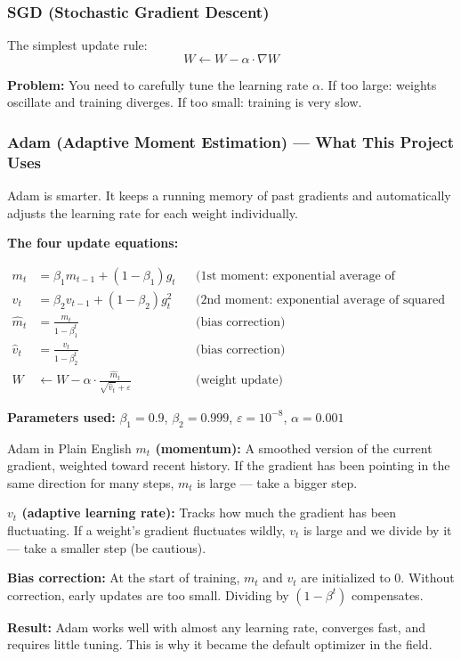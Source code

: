 \documentclass[12pt, a4paper]{article}
\begin{document}
\subsubsection{SGD (Stochastic Gradient Descent)}

The simplest update rule:
\begin{equation}
  W \leftarrow W - \alpha \cdot \nabla W
\end{equation}

\textbf{Problem:} You need to carefully tune the learning rate $\alpha$. If too large: weights oscillate and training diverges. If too small: training is very slow.

\subsubsection{Adam (Adaptive Moment Estimation) --- What This Project Uses}

Adam is smarter. It keeps a running memory of past gradients and automatically adjusts the learning rate for each weight individually.

\textbf{The four update equations:}

\begin{align}
  m_t &= \beta_1 m_{t-1} + (1 - \beta_1) g_t && \text{(1st moment: exponential average of gradients)}\\
  v_t &= \beta_2 v_{t-1} + (1 - \beta_2) g_t^2 && \text{(2nd moment: exponential average of squared gradients)}\\
  \hat{m}_t &= \frac{m_t}{1 - \beta_1^t} && \text{(bias correction)}\\
  \hat{v}_t &= \frac{v_t}{1 - \beta_2^t} && \text{(bias correction)}\\
  W &\leftarrow W - \alpha \cdot \frac{\hat{m}_t}{\sqrt{\hat{v}_t} + \varepsilon} && \text{(weight update)}
\end{align}

\textbf{Parameters used:} $\beta_1 = 0.9$, $\beta_2 = 0.999$, $\varepsilon = 10^{-8}$, $\alpha = 0.001$

\begin{conceptbox}{Adam in Plain English}
\textbf{$m_t$ (momentum):} A smoothed version of the current gradient, weighted toward recent history. If the gradient has been pointing in the same direction for many steps, $m_t$ is large --- take a bigger step.

\textbf{$v_t$ (adaptive learning rate):} Tracks how much the gradient has been fluctuating. If a weight's gradient fluctuates wildly, $v_t$ is large and we divide by it --- take a smaller step (be cautious).

\textbf{Bias correction:} At the start of training, $m_t$ and $v_t$ are initialized to 0. Without correction, early updates are too small. Dividing by $(1 - \beta^t)$ compensates.

\textbf{Result:} Adam works well with almost any learning rate, converges fast, and requires little tuning. This is why it became the default optimizer in the field.
\end{conceptbox}
\end{document}
